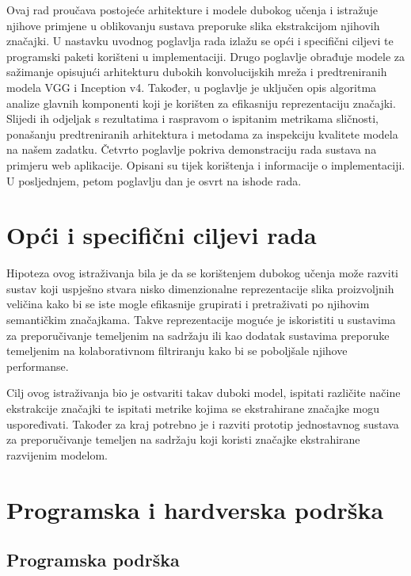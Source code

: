 \documentclass[times, utf8, proizvoljni, numeric]{fer}
\begin{document}
Ovaj rad proučava postojeće arhitekture i modele dubokog učenja i istražuje njihove primjene u oblikovanju sustava preporuke slika ekstrakcijom njihovih značajki. U nastavku uvodnog poglavlja rada izlažu se opći i specifični ciljevi te programski paketi korišteni u implementaciji. Drugo poglavlje obrađuje modele za sažimanje opisujući arhitekturu dubokih konvolucijskih mreža i predtreniranih modela VGG i Inception v4. Također, u poglavlje je uključen opis algoritma analize glavnih komponenti koji je korišten za efikasniju reprezentaciju značajki. Slijedi ih odjeljak s rezultatima i raspravom o ispitanim metrikama sličnosti, ponašanju predtreniranih arhitektura i metodama za inspekciju kvalitete modela na našem zadatku. Četvrto poglavlje pokriva demonstraciju rada sustava na primjeru web aplikacije. Opisani su tijek korištenja i informacije o implementaciji. U posljednjem, petom poglavlju dan je osvrt na ishode rada.
 


\section{Opći i specifični ciljevi rada}

Hipoteza ovog istraživanja bila je da se korištenjem dubokog učenja može razviti sustav koji uspješno stvara nisko dimenzionalne reprezentacije slika proizvoljnih veličina kako bi se iste mogle efikasnije grupirati i pretraživati po njihovim semantičkim značajkama. Takve reprezentacije moguće je iskoristiti u sustavima za preporučivanje temeljenim na sadržaju ili kao dodatak sustavima preporuke temeljenim na kolaborativnom filtriranju kako bi se poboljšale njihove performanse.

Cilj ovog istraživanja bio je ostvariti takav duboki model, ispitati različite načine ekstrakcije značajki te ispitati metrike kojima se ekstrahirane značajke mogu uspoređivati. Također za kraj potrebno je i razviti prototip jednostavnog sustava za preporučivanje temeljen na sadržaju koji koristi značajke ekstrahirane razvijenim modelom.

\section{Programska i hardverska podrška}
\subsection{Programska podrška}
\end{document}
